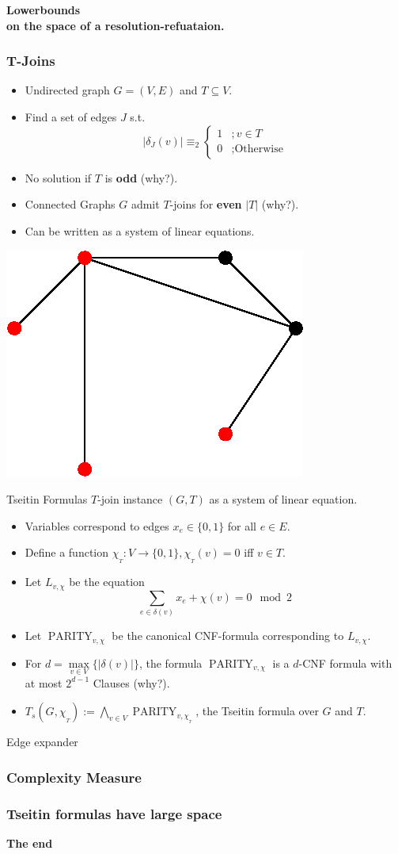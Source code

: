 \documentclass[t,usenames,dvipsnames]{beamer}
\begin{document}
\begin{frame}[c]
	\color{NavyBlue} \centering \Large \textbf{
	Lowerbounds\\on the space of a resolution-refuataion.}
\end{frame}

\begin{frame} \frametitle{T-Joins}
	\begin{itemize}[<+->]
		\item Undirected graph $G = (V, E)$ and $T \subseteq V$.
		\item Find a set of edges $J$ s.t.
			$$
			|\delta_J(v)| \equiv_2
			\begin{cases}
				1&; v \in T\\
				0&; \text{Otherwise}
			\end{cases}
			$$
		\item No solution if $T$ is \textbf{odd} (why?).
		\item Connected Graphs $G$ admit $T$-joins for \textbf{even} $|T|$ (why?).
		\item Can be written as a system of linear equations.
	\end{itemize}
	\begin{center}
		\includegraphics[width=0.35\linewidth]{graph.eps}
	\end{center}
\end{frame}
\begin{frame}{Tseitin Formulas}
	$T$-join instance $(G, T)$ as a system of linear equation.
	\pause
	\begin{itemize}[<+->]
		\item Variables correspond to edges $x_e \in \{0, 1\}$ for all $e \in E$.
		\item Define a function $\chi_{_T}: V \rightarrow \{0, 1\}, \chi_{_T}(v)=0$ iff $v
			\in T$.
		\item Let  $L_{v, \chi}$ be the equation
		$$\sum\limits_{e \in \delta(v)} x_e + \chi(v) = 0 \mod 2$$
		\item Let $\operatorname{PARITY}_{v, \chi}$ be the canonical CNF-formula
			corresponding to  $L_{v, \chi}$.
		\item For $d = \max\limits_{v \in V}\{|\delta(v)|\}$, the formula
			$\operatorname{PARITY}_{v, \chi}$ is a $d$-CNF formula with at most
			$2^{d-1}$ Clauses (why?).
		\item $T_s(G, \chi_{_T}) := \bigwedge_{v \in V} \operatorname{PARITY}_{v,
			\chi_{_T}}$, the Tseitin formula over $G$ and $T$.
	\end{itemize}
\end{frame}
\begin{frame}{Edge expander}
	
\end{frame}

\begin{frame} \frametitle{Complexity Measure}
\end{frame}

\begin{frame} \frametitle{Tseitin formulas have large space}
	\pause \vfill \vfill \hfill \textbf{\Large\color{NavyBlue}The end}
\end{frame}
\end{document}
